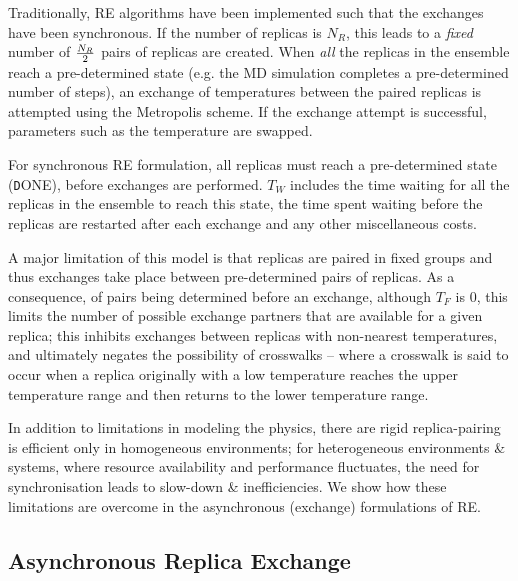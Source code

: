 \documentclass{rspublic}
\begin{document}
Traditionally, RE algorithms have been implemented such that the
exchanges have been synchronous.  If the number of replicas is
${N_R}$, this leads to a {\it fixed} number of ${N_R \over 2}$ pairs
of replicas are created.  When \emph{all} the replicas in the ensemble
reach a pre-determined state (e.g. the MD simulation completes a
pre-determined number of steps), an exchange of temperatures between
the paired replicas is attempted using the Metropolis scheme.  If the
exchange attempt is successful, parameters such as the temperature are
swapped.


For synchronous RE formulation, all replicas must reach a
pre-determined state ({\texttt DONE}), before exchanges are performed.
$T_W$ includes the time waiting for all the replicas in the ensemble
to reach this state, the time spent waiting before the replicas are
restarted after each exchange and any other miscellaneous costs.

A major limitation of this model is that replicas are paired in fixed
groups and thus exchanges take place between pre-determined pairs of
replicas.  As a consequence, of pairs being determined before an
exchange, although $T_F$ is $0$, this limits the number of possible
exchange partners that are available for a given replica; this
inhibits exchanges between replicas with non-nearest temperatures, and
ultimately negates the possibility of crosswalks -- where a crosswalk
is said to occur when a replica originally with a low temperature
reaches the upper temperature range and then returns to the lower
temperature range.

In addition to limitations in modeling the physics, there are rigid
replica-pairing is efficient only in homogeneous environments; for
heterogeneous environments \& systems, where resource availability and
performance fluctuates, the need for synchronisation leads to
slow-down \& inefficiencies. We show how these limitations are
overcome in the asynchronous (exchange) formulations of RE.

\subsection{Asynchronous Replica Exchange}

\end{document}

